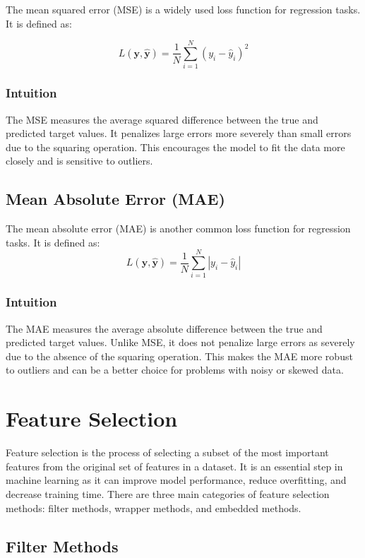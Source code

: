 \documentclass[12pt]{article}
\begin{document}
The mean squared error (MSE) is a widely used loss function for regression tasks. It is defined as:

$$L(\boldsymbol{y}, \boldsymbol{\hat{y}}) = \frac{1}{N} \sum_{i=1}^{N} (y_i - \hat{y}_i)^2$$

\subsubsection{Intuition}

The MSE measures the average squared difference between the true and predicted target values. It penalizes large errors more severely than small errors due to the squaring operation. This encourages the model to fit the data more closely and is sensitive to outliers.

\subsection{Mean Absolute Error (MAE)}

The mean absolute error (MAE) is another common loss function for regression tasks. It is defined as:
$$ L(\boldsymbol{y}, \boldsymbol{\hat{y}}) = \frac{1}{N} \sum_{i=1}^{N} |y_i - \hat{y}_i|$$
\subsubsection{Intuition}

The MAE measures the average absolute difference between the true and predicted target values. Unlike MSE, it does not penalize large errors as severely due to the absence of the squaring operation. This makes the MAE more robust to outliers and can be a better choice for problems with noisy or skewed data.


\section{Feature Selection}

Feature selection is the process of selecting a subset of the most important features from the original set of features in a dataset. It is an essential step in machine learning as it can improve model performance, reduce overfitting, and decrease training time. There are three main categories of feature selection methods: filter methods, wrapper methods, and embedded methods.

\subsection{Filter Methods}
\end{document}
